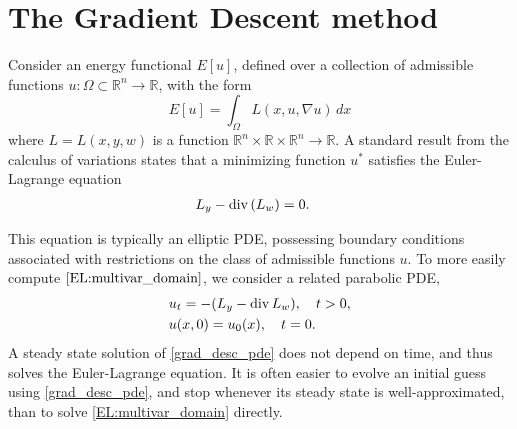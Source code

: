 \label{lab:tv_images}




\section*{The Gradient Descent method}
Consider an energy functional $E[u]$, defined over a collection of admissible functions $u:\Omega \subset \mathbb{R}^n \to \mathbb{R}$, with the form 
\[E[u] = \int_{\Omega} L(x,u,\nabla u) \, dx\]
where $L = L(x,y,w)$ is a function $\mathbb{R}^n \times \mathbb{R} \times \mathbb{R}^n \to \mathbb{R}$. 
A standard result from the calculus of variations states that a minimizing function $u^*$ satisfies the Euler-Lagrange equation
\begin{align}
L_y - {\rm div}\,(L_w) &= 0.	\label{EL:multivar_domain}
\end{align}

This equation is typically an elliptic PDE, possessing boundary conditions associated with  restrictions on the class of admissible functions $u$.
To more easily compute $\eqref{EL:multivar_domain}$, we consider a related parabolic PDE,
\begin{align}
	\begin{split}
	&{ } u_t = -(L_y - {\rm div}\, L_w), \quad t > 0,\\
	&{ } u(x,0) = u_0(x), \quad t = 0. 
	\end{split} \label{grad_desc_pde}
\end{align}
A steady state solution of \eqref{grad_desc_pde} does not depend on time, and thus solves the Euler-Lagrange equation. 
It is often easier to evolve an initial guess using \eqref{grad_desc_pde}, and stop whenever its steady state is well-approximated, than to solve \eqref{EL:multivar_domain} directly. 

